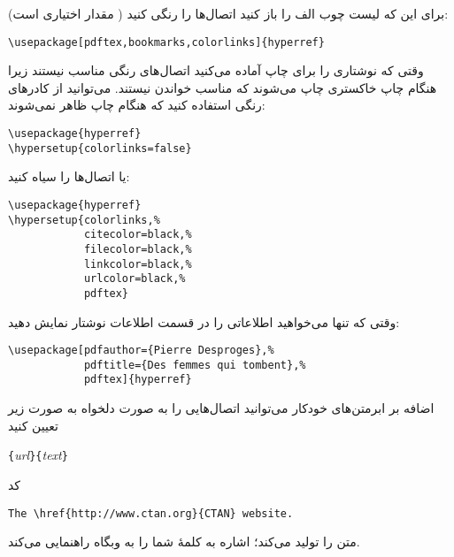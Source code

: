 برای این که لیست چوب الف‌ را باز کنید  اتصال‌ها را رنگی کنید 
( مقدار   اختیاری است):
\begin{code}
\begin{verbatim}
\usepackage[pdftex,bookmarks,colorlinks]{hyperref}
\end{verbatim}
\end{code}

وقتی که نوشتار‌ی را برای چاپ آماده می‌کنید اتصال‌های رنگی مناسب نیستند زیرا هنگام چاپ خاکستری چاپ می‌شوند که مناسب خواندن نیستند. می‌توانید از کادرهای رنگی استفاده کنید که هنگام چاپ ظاهر نمی‌شوند:
\begin{code}
\begin{verbatim}
\usepackage{hyperref}
\hypersetup{colorlinks=false}
\end{verbatim}
\end{code}
\noindent یا اتصال‌ها را سیاه کنید:
\begin{code}
\begin{verbatim}
\usepackage{hyperref}
\hypersetup{colorlinks,%
            citecolor=black,%
            filecolor=black,%
            linkcolor=black,%
            urlcolor=black,%
            pdftex}
\end{verbatim}
\end{code}

وقتی که تنها می‌خواهید اطلاعاتی را در قسمت اطلاعات نوشتار نمایش دهید:
\begin{code}
\begin{verbatim}
\usepackage[pdfauthor={Pierre Desproges},%
            pdftitle={Des femmes qui tombent},%
            pdftex]{hyperref}
\end{verbatim}
\end{code}

\vspace{\baselineskip}

اضافه بر ابرمتن‌های خودکار می‌توانید اتصال‌هایی را به صورت دلخواه به صورت زیر تعیین کنید

\begin{lscommand}
\verb|{|\emph{url}\verb|}{|\emph{text}\verb|}|
\end{lscommand}

کد 

\begin{code}
\begin{verbatim}
The \href{http://www.ctan.org}{CTAN} website.
\end{verbatim}
\end{code}

متن  
 را تولید می‌کند؛ اشاره به کلمهٔ   شما را به وبگاه  راهنمایی می‌کند.

